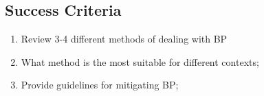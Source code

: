 \subsection{Success Criteria}
\begin{enumerate}
    \item Review 3-4 different methods of dealing with BP
    \item What method is the most suitable for different contexts;
    \item Provide guidelines for mitigating BP;
\end{enumerate}

